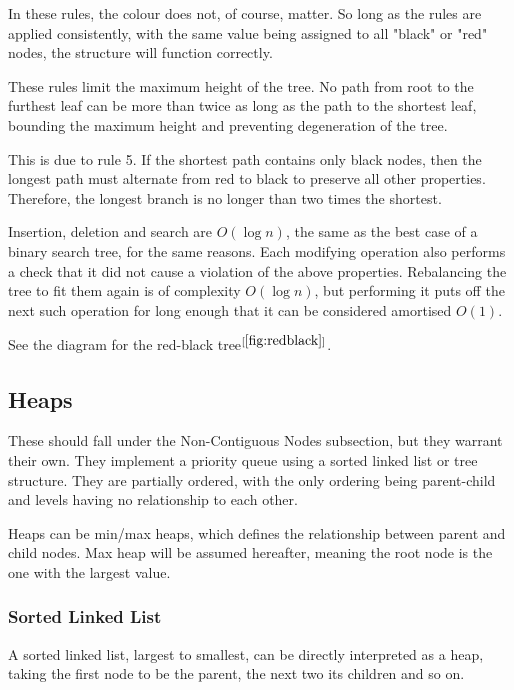 \documentclass[]{article}
\begin{document}
In these rules, the colour does not, of course, matter. So long as the rules are applied consistently, with the same value being assigned to all "black" or "red" nodes, the structure will function correctly.

These rules limit the maximum height of the tree. No path from root to the furthest leaf can be more than twice as long as the path to the shortest leaf, bounding the maximum height and preventing degeneration of the tree.

This is due to rule 5. If the shortest path contains only black nodes, then the longest path must alternate from red to black to preserve all other properties. Therefore, the longest branch is no longer than two times the shortest.

Insertion, deletion and search are $O(\log{n})$, the same as the best case of a binary search tree, for the same reasons. Each modifying operation also performs a check that it did not cause a violation of the above properties. Rebalancing the tree to fit them again is of complexity $O(\log{n})$, but performing it puts off the next such operation for long enough that it can be considered amortised $O(1)$.

See the diagram for the red-black tree$^{[\ref{fig:redblack}]}$.

\pagebreak

\subsection{Heaps}

These should fall under the Non-Contiguous Nodes subsection, but they warrant their own. They implement a priority queue using a sorted linked list or tree structure. They are partially ordered, with the only ordering being parent-child and levels having no relationship to each other.

Heaps can be min/max heaps, which defines the relationship between parent and child nodes. Max heap will be assumed hereafter, meaning the root node is the one with the largest value.

\subsubsection{Sorted Linked List}

A sorted linked list, largest to smallest, can be directly interpreted as a heap, taking the first node to be the parent, the next two its children and so on.
\end{document}
